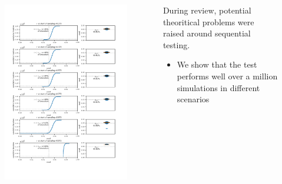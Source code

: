 \documentclass[9pt, aspectratio=169]{beamer}
\begin{document}
\begin{frame}
	\begin{columns}
		\begin{column}{0.382\linewidth}
			\begin{figure}
				\includegraphics[width=\linewidth]{../manuscript/2_figs_hyper_validation}
			\end{figure}
		\end{column}
		\begin{column}{0.618\linewidth}
			
			During review, potential theoritical problems were raised around sequential testing.
			
			\begin{itemize}
				\item We show that the test performs well over a million simulations in different scenarios 
			\end{itemize}
			
		\end{column}
	\end{columns}
\end{frame}

\backupend
\end{document}
